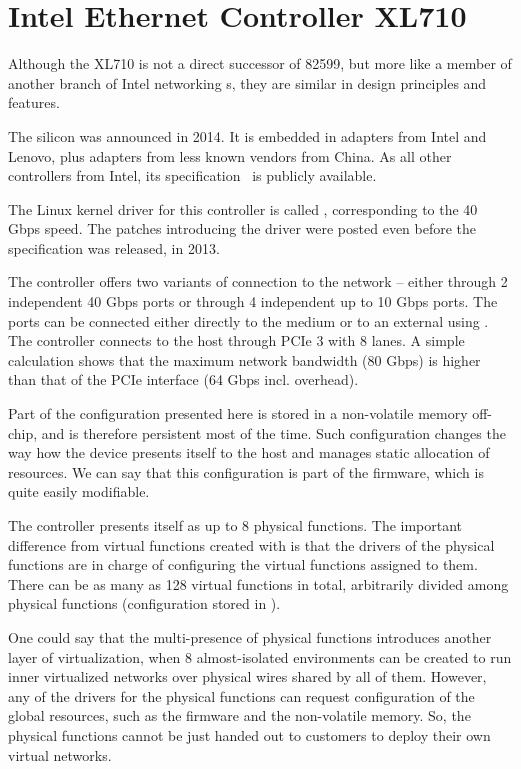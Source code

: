 \section{Intel Ethernet Controller XL710}
\label{nic:xl710}
\renewcommand{\sect}[1]{\cite[#1]{XL710}}


Although the XL710 is not a direct successor of 82599, but more like a member
of another branch of Intel networking s, they are similar in design
principles and features.

The silicon was announced in 2014. It is embedded in adapters from Intel and
Lenovo, plus adapters from less known vendors from China. As all other controllers from
Intel, its specification~\cite{XL710} is publicly available.

The Linux kernel driver for this controller is called , corresponding
to the 40 Gbps speed. The patches introducing the driver were posted even
before the specification was released, in 2013.

The controller offers two variants of connection to the network -- either
through 2 independent 40 Gbps ports or through 4 independent up to 10 Gbps
ports. The ports can be connected either directly to the medium or to an
external  using . The controller connects to the host through
PCIe 3 with 8 lanes. A simple calculation shows that the maximum network
bandwidth (80 Gbps) is higher than that of the PCIe interface (64 Gbps incl. overhead).

Part of the configuration presented here is stored in a non-volatile memory
off-chip, and is therefore persistent most of the time. Such configuration
changes the way how the device presents itself to the host and manages static
allocation of resources. We can say that this configuration is part of the
firmware, which is quite easily modifiable.

The controller presents itself as up to 8 physical functions. The important
difference from virtual functions created with  is that the drivers
of the physical functions are in charge of configuring the virtual functions
assigned to them. There can be as many as 128 virtual functions in total,
arbitrarily divided among physical functions (configuration stored in ).

One could say that the multi-presence of physical functions introduces another
layer of virtualization, when 8 almost-isolated environments can be created to
run inner virtualized networks over physical wires shared by all of them.
However, any of the drivers for the physical functions can request
configuration of the global resources, such as the firmware and the
non-volatile memory. So, the physical functions cannot be just handed out to
customers to deploy their own virtual networks.

